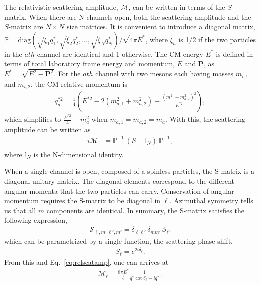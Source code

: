 The relativistic scattering amplitude, $\mathcal{M}$, can be written in terms of the $S$-matrix. When there are N-channels open, both the scattering amplitude and the $S$-matrix are $N\times N$ size matrices. It is convenient to introduce a diagonal matrix, $\mathbb{P}=\text{diag}(\sqrt{\xi_1 q^{*}_1},\sqrt{\xi_2 q^{*}_2},\ldots,\sqrt{\xi_N q^{*}_N})/\sqrt{4\pi E^*}$, where $\xi_a$ is 1/2 if the two particles in the $a{th}$ channel are identical and 1 otherwise. The CM energy $E^*$ is defined in terms of total laboratory frame energy and momentum, $E$ and $\mathbf{P}$, as $E^*=\sqrt{E^2-\mathbf{P}^2}$. For the $a{th}$ channel with two mesons each having masses $m_{i,1}$ and $m_{i,2}$, the CM relative momentum is
\begin{align}
\label{momentum}
q^{*2}_a=\frac{1}{4}\left(E^{*2}-2(m_{a,1}^2+m_{a,2}^2)+\frac{
(m_{,1}^2-m_{a,2}^2)^2}{E^{*2}}\right),
\end{align}
which simplifies to $\frac{E^{*2}}{4}-m_{a}^2$ when $m_{a,1}=m_{a,2}=m_{a}$. With this, the scattering amplitude can be written as 
\begin{align}
\label{eq:relscatamp}
i\mathcal{M}&=\mathbb{P}^{-1}~(S-\mathbb{I}_N)~\mathbb{P}^{-1},\\
\end{align}
where $\mathbb{I}_N$ is the N-dimensional identity. 
 
When a single channel is open, composed of a spinless particles, the S-matrix is a diagonal unitary matrix. The diagonal elements correspond to the different angular momenta that the two particles can carry.  Conservation of angular momentum requires the S-matrix to be diagonal in $\ell$. Azimuthal symmetry tells us that all $m$ components are identical. In summary, the S-matrix satisfies the following expression,
\begin{eqnarray}
\mathcal{S}_{\ell,m;\ell',m'}
=\delta_{\ell\ell'}\,\delta_{m m'}\,\mathcal S_{\ell}.
\end{eqnarray}
 which can be parametrized by a single function, the scattering phase shift,
 \begin{align}
 S_{\ell}=e^{2i\delta_\ell}.
\end{align}
From this and Eq.~\ref{eq:relscatamp}, one can arrives at 
 \begin{align}
\mathcal M_{\ell}=\frac{8\pi E^*}{\xi}\frac{1}{q^*\cot\delta_{\ell}-iq^*} \,.
\label{eq:scatamp}
 \end{align}
{}
 
